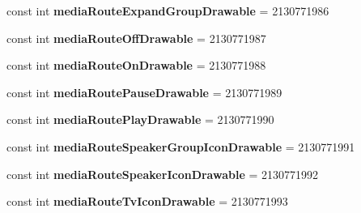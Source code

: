 \begin{DoxyCompactItemize}
\item 
\mbox{\label{class_sample_app_1_1_droid_1_1_resource_1_1_attribute_a40e81a77f40ccca2e192d71d285ed094}} 
const int {\bfseries media\+Route\+Expand\+Group\+Drawable} = 2130771986
\item 
\mbox{\label{class_sample_app_1_1_droid_1_1_resource_1_1_attribute_a24b734f9eab55dcc306dc42fb8dcb80d}} 
const int {\bfseries media\+Route\+Off\+Drawable} = 2130771987
\item 
\mbox{\label{class_sample_app_1_1_droid_1_1_resource_1_1_attribute_a0455a5efe998205310bcb6a08a3244eb}} 
const int {\bfseries media\+Route\+On\+Drawable} = 2130771988
\item 
\mbox{\label{class_sample_app_1_1_droid_1_1_resource_1_1_attribute_a4a746068b3d13fe78c043aece55888a3}} 
const int {\bfseries media\+Route\+Pause\+Drawable} = 2130771989
\item 
\mbox{\label{class_sample_app_1_1_droid_1_1_resource_1_1_attribute_a90ebbb9f4445b5d7e7daedfbc5937c33}} 
const int {\bfseries media\+Route\+Play\+Drawable} = 2130771990
\item 
\mbox{\label{class_sample_app_1_1_droid_1_1_resource_1_1_attribute_a022ced2255f35608b4ac07442169dfa7}} 
const int {\bfseries media\+Route\+Speaker\+Group\+Icon\+Drawable} = 2130771991
\item 
\mbox{\label{class_sample_app_1_1_droid_1_1_resource_1_1_attribute_a369d71b3e003b4a85220a061e9956de4}} 
const int {\bfseries media\+Route\+Speaker\+Icon\+Drawable} = 2130771992
\item 
\mbox{\label{class_sample_app_1_1_droid_1_1_resource_1_1_attribute_a5f2bea0f5b788d23921e93e66bf51dec}} 
const int {\bfseries media\+Route\+Tv\+Icon\+Drawable} = 2130771993
\item 

\end{DoxyCompactItemize}
